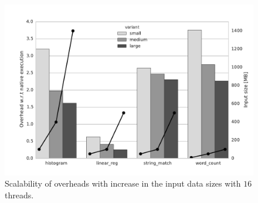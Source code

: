 
\begin{figure}[t]
\centering
\includegraphics[scale=0.35]{figure/benchmarks/worksize-times-xy.pdf}
\caption{Scalability of overheads with increase in the input data sizes with $16$ threads. }
\label{fig:data-size-overheads}
\end{figure}
